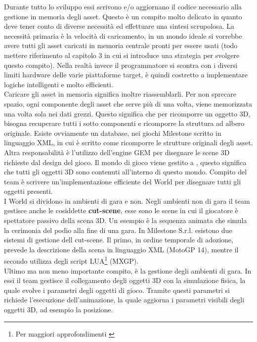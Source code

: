 Durante tutto lo sviluppo essi scrivono e/o aggiornano il codice necessario alla gestione in memoria degli asset. Questo è un compito molto delicato in quanto deve tener conto di diverse necessità ed effettuare una sintesi scrupolosa. La necessità primaria è la velocità di caricamento, in un mondo ideale si vorrebbe avere tutti gli asset caricati in memoria centrale pronti per essere usati (todo mettere riferimento al capitolo 3 in cui si introduce una strategia per svolgere questo compito). Nella realtà invece il programmatore si scontra con i diversi limiti hardware delle varie piattaforme target, è quindi costretto a implementare logiche intelligenti e molto efficienti.\\

Caricare gli asset in memoria significa inoltre riassemblarli. Per non sprecare spazio, ogni componente degli asset che serve più di una volta, viene memorizzata una volta sola nei dati grezzi. Questo significa che per ricomporre un oggetto 3D, bisogna recuperare tutti i sotto componenti e ricomporre la struttura ad albero originale. Esiste ovviamente un database, nei giochi Milestone scritto in linguaggio \gls{XML}, in cui è scritto come ricomporre le strutture originali degli asset.\\

Altra responsabilità è l'utilizzo dell'engine GEM per disegnare le scene 3D richieste dal design del gioco. Il mondo di gioco viene gestito a , questo significa che tutti gli oggetti 3D sono contenuti all'interno di questo mondo. Compito del team è scrivere un'implementazione efficiente del World per disegnare tutti gli oggetti presenti.\\

I World si dividono in ambienti di gara e non. Negli ambienti non di gara il team gestisce anche le cosiddette \textbf{cut-scene}, esse sono le scene in cui il giocatore è spettatore passivo della scena 3D. Un esempio è la sequenza animata che simula la cerimonia del podio alla fine di una gara. In Milestone S.r.l. esistono due sistemi di gestione dell cut-scene. Il primo, in ordine temporale di adozione, prevede la descrizione della scena in linguaggio XML (MotoGP 14), mentre il secondo utilizza degli script \gls{LUA}\footnote{Per maggiori approfondimenti \cite{site:the-use-of-lua-in-real-applications}} (MXGP).\\

Ultimo ma non meno importante compito, è la gestione degli ambienti di gara. In essi il team gestisce il collegamento degli oggetti 3D con la simulazione fisica, la quale evolve i parametri degli oggetti di gioco. Tramite questi parametri si richiede l'esecuzione dell'animazione, la quale aggiorna i parametri visibili degli oggetti 3D, ad esempio la posizione.\\

